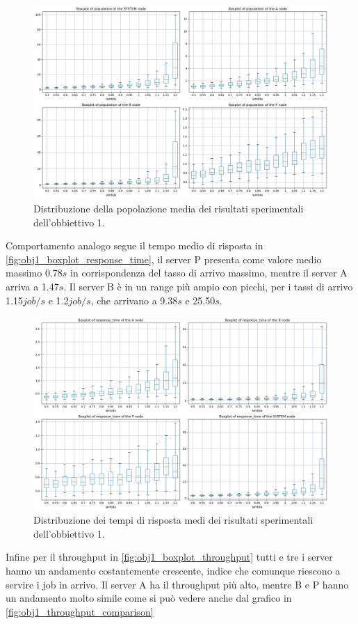\begin{figure}
    \centering
    \includegraphics[width=\textwidth]{figs//results/obj1/obj1-box-population.png}
    \caption{Distribuzione della popolazione media dei risultati sperimentali dell'obbiettivo 1.}
    \label{fig:obj1_boxplot_population}
\end{figure}
Comportamento analogo segue il tempo medio di risposta in \autoref{fig:obj1_boxplot_response_time}, il server P presenta come valore medio massimo 0.78$s$ in corrispondenza del tasso di arrivo massimo, mentre il server A arriva a 1.47$s$. Il server B è in un range più ampio con picchi, per i tassi di arrivo 1.15$job/s$ e 1.2$job/s$, che arrivano a 9.38$s$ e 25.50$s$.
\begin{figure}
    \centering
    \includegraphics[width=\textwidth]{figs//results/obj1/obj1-box-response-time.png}
    \caption{Distribuzione dei tempi di risposta medi dei risultati sperimentali dell'obbiettivo 1.}
    \label{fig:obj1_boxplot_response_time}
\end{figure}
Infine per il throughput in \autoref{fig:obj1_boxplot_throughput} tutti e tre i server hanno un andamento costantemente crescente, indice che comunque riescono a servire i job in arrivo. Il server A ha il throughput più alto, mentre B e P hanno un andamento molto simile come si può vedere anche dal grafico in \autoref{fig:obj1_throughput_comparison}

